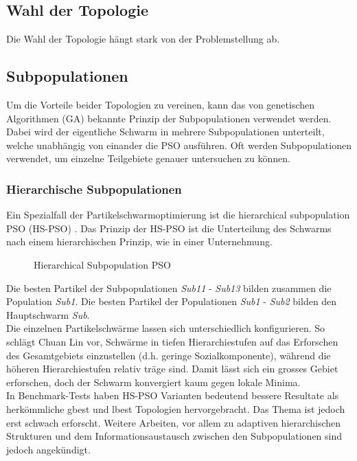 \subsection{Wahl der Topologie}
Die Wahl der Topologie hängt stark von der Problemstellung ab. 

\subsection{Subpopulationen}
Um die Vorteile beider Topologien zu vereinen, kann das von genetischen Algorithmen (GA) bekannte Prinzip der Subpopulationen verwendet werden. Dabei wird der eigentliche Schwarm in mehrere Subpopulationen unterteilt, welche unabhängig von einander die PSO ausführen. Oft werden Subpopulationen verwendet, um einzelne Teilgebiete genauer untersuchen zu können.

\newpage

\subsubsection{Hierarchische Subpopulationen}
Ein Spezialfall der Partikelschwarmoptimierung ist die hierarchical subpopulation PSO (HS-PSO) \cite{ChuanLin-HSPSO}. Das Prinzip der HS-PSO ist die Unterteilung des Schwarms nach einem hierarchischen Prinzip, wie in einer Unternehmung.

\begin{figure}[htbp]
	\centering
	
	\caption{Hierarchical Subpopulation PSO}
	\label{hs-pso}
\end{figure}

Die besten Partikel der Subpopulationen \textit{Sub11} - \textit{Sub13} bilden zusammen die Population \textit{Sub1}. Die besten Partikel der Populationen \textit{Sub1} - \textit{Sub2} bilden den Hauptschwarm \textit{Sub}. \\

Die einzelnen Partikelschwärme lassen sich unterschiedlich konfigurieren. So schlägt Chuan Lin vor, Schwärme in tiefen Hierarchiestufen auf das Erforschen des Gesamtgebiets einzustellen (d.h. geringe Sozialkomponente), während die höheren Hierarchiestufen relativ träge sind. Damit lässt sich ein grosses Gebiet erforschen, doch der Schwarm konvergiert kaum gegen lokale Minima. \\

In Benchmark-Tests haben HS-PSO Varianten bedeutend bessere Resultate als herkömmliche gbest und lbest Topologien hervorgebracht. Das Thema ist jedoch erst schwach erforscht. Weitere Arbeiten, vor allem zu adaptiven hierarchischen Strukturen und dem Informationsaustausch zwischen den Subpopulationen sind jedoch angekündigt.


